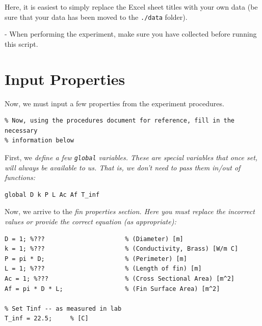 \documentclass[11pt, letterpaper]{article}
\begin{document}
\n
Here, it is easiest to simply replace the Excel sheet titles with your own data (be sure that your data has been moved to the \texttt{./data} folder).

\begin{center}
\begin{tcolorbox}[enhanced, width=14cm, size=tight, top=-2mm, colback=red!5, colframe=black!50!white, boxrule=0.25pt, boxsep=2mm]
\n
{\small
{} - When performing the experiment, make sure you have  collected before running this script.
}
\end{tcolorbox}
\end{center}


\section{Input Properties}

Now, we must input a few properties from the experiment procedures.

\begin{lstlisting}[numbers=none]
%% =========== Part 1: Input Properties ============= 
% Now, using the procedures document for reference, fill in the necessary
% information below
\end{lstlisting}

First, we \it{define} a few \texttt{global} variables. These are special variables that once set, will \textit{always} be available to us. That is, we don't need to pass them in/out of functions:
\begin{lstlisting}[numbers=none]
% set globals
global D k P L Ac Af T_inf
\end{lstlisting}

Now, we arrive to the \it{fin properties} section. Here you must replace the incorrect values or provide the correct equation (as appropriate):
\n

\n
\begin{lstlisting}[numbers=none]
% Fin Properties **FIX ME**
D = 1; %???                      % (Diameter) [m]
k = 1; %???                      % (Conductivity, Brass) [W/m C]
P = pi * D;                      % (Perimeter) [m]
L = 1; %???                      % (Length of fin) [m]
Ac = 1; %???                     % (Cross Sectional Area) [m^2]
Af = pi * D * L;                 % (Fin Surface Area) [m^2]

% Set Tinf -- as measured in lab
T_inf = 22.5;     % [C]
\end{lstlisting}
\end{document}
